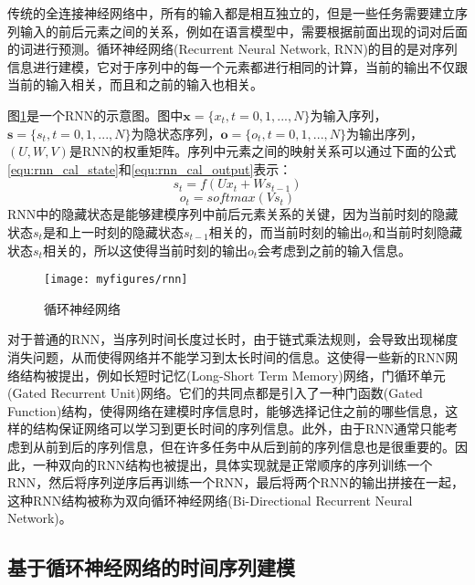 传统的全连接神经网络中，所有的输入都是相互独立的，但是一些任务需要建立序列输入的前后元素之间的关系，例如在语言模型中，需要根据前面出现的词对后面的词进行预测。循环神经网络(Recurrent Neural Network, RNN)的目的是对序列信息进行建模，它对于序列中的每一个元素都进行相同的计算，当前的输出不仅跟当前的输入相关，而且和之前的输入也相关。

图\ref{fig:rnn}是一个RNN的示意图。图中$\mathbf{x}=\{x_t, t=0,1,...,N\}$为输入序列，$\mathbf{s}=\{s_t, t=0,1,...,N\}$为隐状态序列，$\mathbf{o}=\{o_t, t=0,1,...,N\}$为输出序列，$(U, W, V)$是RNN的权重矩阵。序列中元素之间的映射关系可以通过下面的公式\ref{equ:rnn_cal_state}和\ref{equ:rnn_cal_output}表示：
\begin{equation}
\label{equ:rnn_cal_state}
    s_t = f(Ux_t + Ws_{t-1})
\end{equation}
\begin{equation}
\label{equ:rnn_cal_output}
    o_t = softmax(Vs_t)
\end{equation}
RNN中的隐藏状态是能够建模序列中前后元素关系的关键，因为当前时刻的隐藏状态$s_t$是和上一时刻的隐藏状态$s_{t-1}$相关的，而当前时刻的输出$o_t$和当前时刻隐藏状态$s_t$相关的，所以这使得当前时刻的输出$o_t$会考虑到之前的输入信息。

\begin{figure}[htb] %
    \vspace{-0.8cm}  %
    \setlength{\belowcaptionskip}{0cm}   %
    \centering
    \texttt{[image: myfigures/rnn]}
    \caption{循环神经网络}
    \label{fig:rnn}
\end{figure}

对于普通的RNN，当序列时间长度过长时，由于链式乘法规则，会导致出现梯度消失问题，从而使得网络并不能学习到太长时间的信息。这使得一些新的RNN网络结构被提出，例如长短时记忆(Long-Short Term Memory)网络，门循环单元(Gated Recurrent Unit)网络。它们的共同点都是引入了一种门函数(Gated Function)结构，使得网络在建模时序信息时，能够选择记住之前的哪些信息，这样的结构保证网络可以学习到更长时间的序列信息。此外，由于RNN通常只能考虑到从前到后的序列信息，但在许多任务中从后到前的序列信息也是很重要的。因此，一种双向的RNN结构也被提出，具体实现就是正常顺序的序列训练一个RNN，然后将序列逆序后再训练一个RNN，最后将两个RNN的输出拼接在一起，这种RNN结构被称为双向循环神经网络(Bi-Directional Recurrent Neural Network)。

\subsection{基于循环神经网络的时间序列建模}
\label{ssec:rnn_seq_model_detail}

